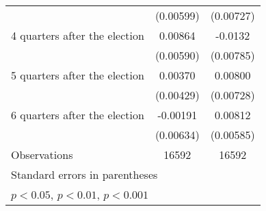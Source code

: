 \begin{table}[htbp]
\begin{tabular}{l*{2}{c}}
                    &   (0.00599)         &   (0.00727)         \\
[1em]
 4 quarters after the election&     0.00864         &     -0.0132         \\
                    &   (0.00590)         &   (0.00785)         \\
[1em]
 5 quarters after the election&     0.00370         &     0.00800         \\
                    &   (0.00429)         &   (0.00728)         \\
[1em]
 6 quarters after the election&    -0.00191         &     0.00812         \\
                    &   (0.00634)         &   (0.00585)         \\
\hline
Observations        &       16592         &       16592         \\
\hline\hline
\multicolumn{3}{l}{\footnotesize Standard errors in parentheses}\\
\multicolumn{3}{l}{\footnotesize \sym{*} \(p<0.05\), \sym{**} \(p<0.01\), \sym{***} \(p<0.001\)}\\
\end{tabular}
\end{table}
